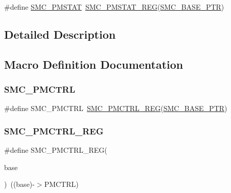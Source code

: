 \begin{DoxyCompactItemize}
\item 
\#define \hyperlink{group___s_m_c___register___accessor___macros_ga6311e0572e3a1f7d84e1069716b64307}{S\+M\+C\+\_\+\+P\+M\+S\+T\+AT}~\hyperlink{group___s_m_c___register___accessor___macros_ga9d5f2b2a54cff2641473312ac780203e}{S\+M\+C\+\_\+\+P\+M\+S\+T\+A\+T\+\_\+\+R\+EG}(\hyperlink{group___s_m_c___peripheral_ga31b6c4571795341e6446800243313e56}{S\+M\+C\+\_\+\+B\+A\+S\+E\+\_\+\+P\+TR})
\end{DoxyCompactItemize}


\subsection{Detailed Description}


\subsection{Macro Definition Documentation}
\mbox{\label{group___s_m_c___register___accessor___macros_ga4b2bae0309aecee21e9fe70ac7dbe3dc}} 
\subsubsection{\texorpdfstring{S\+M\+C\+\_\+\+P\+M\+C\+T\+RL}{SMC\_PMCTRL}}
{\footnotesize\ttfamily \#define S\+M\+C\+\_\+\+P\+M\+C\+T\+RL~\hyperlink{group___s_m_c___register___accessor___macros_gaca57398aaa8f982675e83347cc971a66}{S\+M\+C\+\_\+\+P\+M\+C\+T\+R\+L\+\_\+\+R\+EG}(\hyperlink{group___s_m_c___peripheral_ga31b6c4571795341e6446800243313e56}{S\+M\+C\+\_\+\+B\+A\+S\+E\+\_\+\+P\+TR})}

\mbox{\label{group___s_m_c___register___accessor___macros_gaca57398aaa8f982675e83347cc971a66}} 
\subsubsection{\texorpdfstring{S\+M\+C\+\_\+\+P\+M\+C\+T\+R\+L\+\_\+\+R\+EG}{SMC\_PMCTRL\_REG}}
{\footnotesize\ttfamily \#define S\+M\+C\+\_\+\+P\+M\+C\+T\+R\+L\+\_\+\+R\+EG(\begin{DoxyParamCaption}\item[{}]{base }\end{DoxyParamCaption})~((base)-\/$>$P\+M\+C\+T\+RL)}


